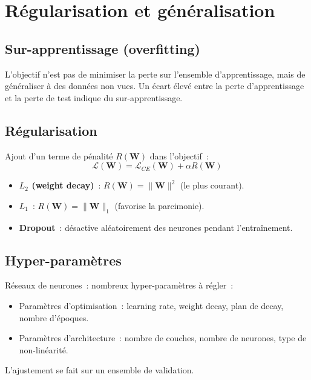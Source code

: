 \documentclass[a4paper,11pt]{article}
\theoremstyle{definition}
\theoremstyle{remark}
\begin{document}
\section{R\'egularisation et g\'en\'eralisation}

\subsection{Sur-apprentissage (overfitting)}
L'objectif n'est pas de minimiser la perte sur l'ensemble
d'apprentissage, mais de g\'en\'eraliser \`a des donn\'ees non
vues. Un \'ecart \'elev\'e entre la perte d'apprentissage et la
perte de test indique du sur-apprentissage.

\subsection{R\'egularisation}

Ajout d'un terme de p\'enalit\'e $R(\mathbf{W})$ dans l'objectif~:
\begin{equation}
  \mathcal{L}(\mathbf{W}) = \mathcal{L}_{CE}(\mathbf{W}) +
  \alpha R(\mathbf{W})
\end{equation}

\begin{itemize}
  \item \textbf{$L_2$ (weight decay)}~: $R(\mathbf{W}) =
    \|\mathbf{W}\|^2$ (le plus courant).
  \item \textbf{$L_1$}~: $R(\mathbf{W}) = \|\mathbf{W}\|_1$
    (favorise la parcimonie).
  \item \textbf{Dropout}~: d\'esactive al\'eatoirement des neurones
    pendant l'entra\^inement.
\end{itemize}

\subsection{Hyper-param\`etres}

R\'eseaux de neurones~: nombreux hyper-param\`etres \`a r\'egler~:
\begin{itemize}
  \item Param\`etres d'optimisation~: learning rate, weight decay,
    plan de decay, nombre d'\'epoques.
  \item Param\`etres d'architecture~: nombre de couches, nombre de
    neurones, type de non-lin\'earit\'e.
\end{itemize}
L'ajustement se fait sur un ensemble de validation.
\end{document}
